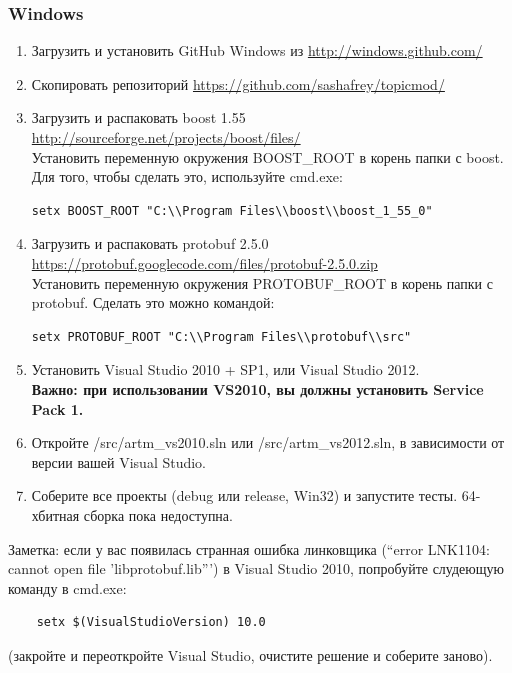 \documentclass[12pt]{article}
\begin{document}
\subsubsection{Windows}

\begin{enumerate}
   \item Загрузить и установить GitHub Windows из \url{http://windows.github.com/}
   \item Скопировать репозиторий \url{https://github.com/sashafrey/topicmod/} 
   \item Загрузить и распаковать boost 1.55  \\
         \url{http://sourceforge.net/projects/boost/files/} \\
         Установить переменную окружения BOOST\_ROOT в корень папки с boost.
         Для того, чтобы сделать это, используйте cmd.exe:
\begin{verbatim}
setx BOOST_ROOT "C:\\Program Files\\boost\\boost_1_55_0"
\end{verbatim}
   \item Загрузить и распаковать protobuf 2.5.0 \\
         \url{https://protobuf.googlecode.com/files/protobuf-2.5.0.zip} \\
         Установить переменную окружения PROTOBUF\_ROOT в корень папки с protobuf. Сделать это можно командой:
\begin{verbatim}
setx PROTOBUF_ROOT "C:\\Program Files\\protobuf\\src"
\end{verbatim}
    \item Установить Visual Studio 2010 + SP1, или Visual Studio 2012. \\
    {\bf Важно: при использовании VS2010, вы должны установить Service Pack 1.}
    \item Откройте /src/artm\_vs2010.sln или /src/artm\_vs2012.sln, в зависимости от версии вашей Visual Studio.
    \item Соберите все проекты (debug или release, Win32) и запустите тесты. 64-хбитная сборка пока недоступна.
\end{enumerate}

Заметка: если у вас появилась странная ошибка линковщика (``error LNK1104: cannot open file 'libprotobuf.lib''')
      в Visual Studio 2010, попробуйте слудеющую команду в cmd.exe:
\begin{verbatim}
    setx $(VisualStudioVersion) 10.0
\end{verbatim}
(закройте и переоткройте Visual Studio, очистите решение и соберите заново).
\end{document}
